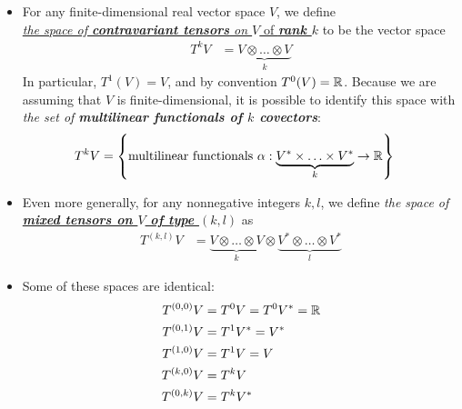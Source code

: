 \documentclass[11pt]{article}
\begin{document}
\begin{itemize}
\item \begin{definition}
For any finite-dimensional real vector space $V$, we define \\ \underline{\emph{the space of \textbf{contravariant tensors} on $V$} of \emph{\textbf{rank $k$}}} to be the vector space
\begin{align*}
T^{k}V &= \underbrace{V\otimes \ldots \otimes V}_{k}
\end{align*} In particular, $T^1(V) = V$, and by convention $T^0(V) = {\mathbb R}$. Because we are assuming that $V$ is finite-dimensional, it is possible to identify this space with \emph{the set of \textbf{multilinear functionals of $k$ covectors}}:
\begin{align*}
T^{k}V &= \left\{\text{multilinear functionals }\alpha: \underbrace{V^{*}\times \ldots \times V^{*}}_{k} \rightarrow {\mathbb R} \right\}
\end{align*}
\end{definition}

\item \begin{definition}
Even more generally, for any nonnegative integers $k, l$, we define \emph{the space of \underline{\textbf{mixed tensors on $V$ of type $(k,l)$}}} as
\begin{align*}
T^{(k,l)}V &= \underbrace{V\otimes \ldots \otimes V}_{k} \otimes \underbrace{V^{*}\otimes \ldots \otimes V^{*}}_{l}
\end{align*}
\end{definition}

\item \begin{remark} Some of these spaces are identical:
\begin{align*}
T^{(0,0)}V &= T^0V = T^{0}V^{*} =  {\mathbb R}\\
T^{(0,1)}V &= T^{1}V^{*} = V^{*}\\
T^{(1,0)}V &= T^{1}V = V\\
T^{(k,0)}V &= T^{k}V \\
T^{(0,k)}V &= T^{k}V^{*}
\end{align*}
\end{remark}


\end{itemize}
\end{document}
